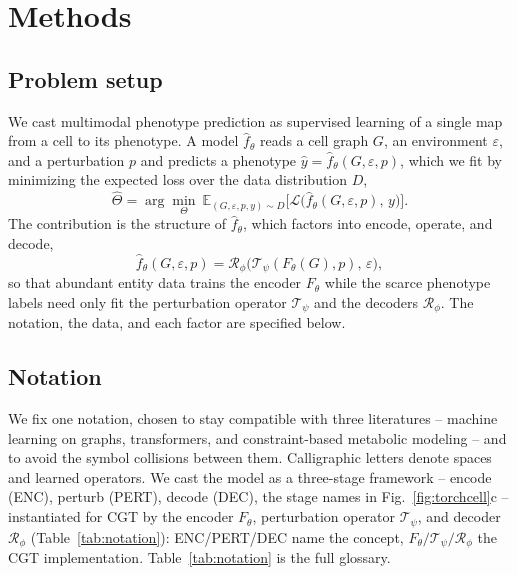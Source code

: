 \FloatBarrier
\section{Methods}\label{sec:methods}

\subsection*{Problem setup}
We cast multimodal phenotype prediction as supervised learning of a single map from a cell
to its phenotype. A model $\hat f_\theta$ reads a cell graph $G$, an environment
$\varepsilon$, and a perturbation $p$ and predicts a phenotype
$\hat y=\hat f_\theta(G,\varepsilon,p)$, which we fit by minimizing the expected loss over
the data distribution $D$,
\begin{equation}
\hat\Theta=\arg\min_{\Theta}\ \mathbb{E}_{(G,\varepsilon,p,y)\sim D}
\big[\mathcal{L}\big(\hat f_\theta(G,\varepsilon,p),\,y\big)\big].
\label{eq:objective}
\end{equation}
The contribution is the structure of $\hat f_\theta$, which factors into encode, operate,
and decode,
\begin{equation}
\hat f_\theta(G,\varepsilon,p)=\mathcal{R}_\phi\big(\mathcal{T}_\psi(F_\theta(G),p),\,\varepsilon\big),
\label{eq:factor}
\end{equation}
so that abundant entity data trains the encoder $F_\theta$ while the scarce phenotype
labels need only fit the perturbation operator $\mathcal{T}_\psi$ and the decoders
$\mathcal{R}_\phi$. The notation, the data, and each factor are specified below.

\subsection*{Notation}
We fix one notation, chosen to stay compatible with three literatures -- machine learning
on graphs, transformers, and constraint-based metabolic modeling -- and to avoid the
symbol collisions between them. Calligraphic letters denote spaces and learned operators. We cast the model as a
three-stage framework -- encode (ENC), perturb (PERT), decode (DEC), the stage names in
Fig.~\ref{fig:torchcell}c -- instantiated for CGT by the encoder $F_\theta$, perturbation
operator $\mathcal{T}_\psi$, and decoder $\mathcal{R}_\phi$ (Table~\ref{tab:notation}):
ENC/PERT/DEC name the concept, $F_\theta/\mathcal{T}_\psi/\mathcal{R}_\phi$ the CGT
implementation. Table~\ref{tab:notation} is the full glossary.

